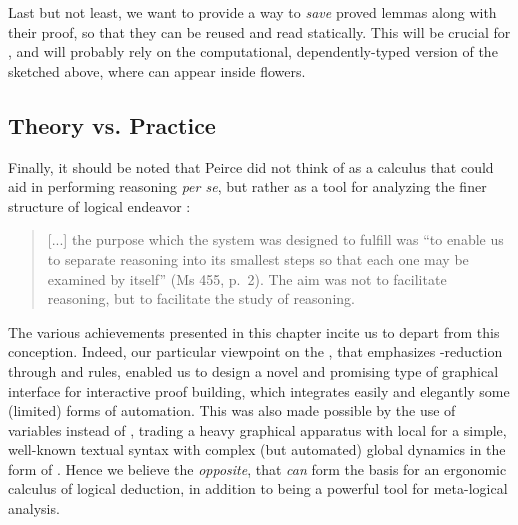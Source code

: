 \begin{scope}
Last but not least, we want to provide a way to \emph{save} proved lemmas along
with their proof, so that they can be reused and read statically. This will be
crucial for \emph{}, and will probably rely on the computational,
dependently-typed version of the  sketched above, where  can appear inside flowers.

\subsection{Theory vs. Practice}

Finally, it should be noted that Peirce did not think of  as a calculus that
could aid in performing reasoning \emph{per se}, but rather as a tool for
analyzing the finer structure of logical endeavor
\cite[pp.~110--111]{Roberts+1973}:
\begin{quote}
  [...] the purpose which the system was designed to fulfill was ``to enable us
to separate reasoning into its smallest steps so that each one may be examined
by itself'' (Ms 455, p.~2). The aim was not to facilitate reasoning, but to
facilitate the study of reasoning.
\end{quote}

The various achievements presented in this chapter incite us to depart from this
conception. Indeed, our particular viewpoint on the ,
that emphasizes -reduction through  and 
rules, enabled us to design a novel and promising type of graphical interface
for interactive proof building, which integrates easily and elegantly some
(limited) forms of automation. This was also made possible by the use of
variables instead of , trading a heavy graphical apparatus
with local  for a simple, well-known textual syntax with
complex (but automated) global dynamics in the form of . Hence
we believe the \emph{opposite}, that  \emph{can} form the basis for an
ergonomic calculus of logical deduction, in addition to being a powerful tool
for meta-logical analysis.


\end{scope}
